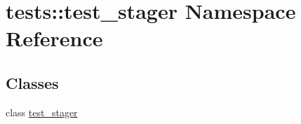 \hypertarget{namespacetests_1_1test__stager}{\section{tests\-:\-:test\-\_\-stager \-Namespace \-Reference}
\label{namespacetests_1_1test__stager}
}
\subsection*{\-Classes}
\begin{DoxyCompactItemize}
\item 
class \hyperlink{classtests_1_1test__stager_1_1test__stager}{test\-\_\-stager}
\end{DoxyCompactItemize}
